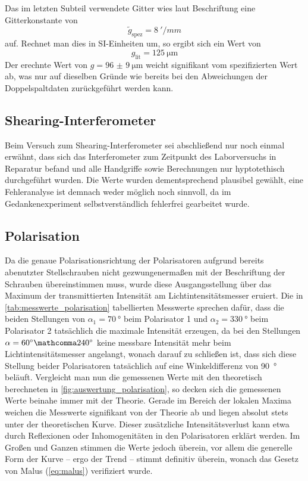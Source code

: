 \documentclass[ngerman]{scrartcl}
\begin{document}
Das im letzten Subteil verwendete Gitter wies laut Beschriftung eine Gitterkonstante von
\[\tilde{g}_{\text{spez}}=\SI{8}{'/mm}\]
auf. Rechnet man dies in SI-Einheiten um, so ergibt sich ein Wert von
\[g_{\text{lit}}=\SI{125}{\micro\meter}\]
Der erechnte Wert von \(g = \SI{96(9)}{\micro\meter}\) weicht signifikant vom spezifizierten Wert ab, was nur auf dieselben Gründe wie bereits bei den Abweichungen der Doppelspaltdaten zurückgeführt werden kann.


\subsection{Shearing-Interferometer}
\label{subsec:diskussion_shearing}

Beim Versuch zum Shearing-Interferometer sei abschließend nur noch einmal erwähnt, dass sich das Interferometer zum Zeitpunkt des Laborversuchs in Reparatur befand und alle Handgriffe sowie Berechnungen nur hyptotethisch durchgeführt wurden. Die Werte wurden dementsprechend plausibel gewählt, eine Fehleranalyse ist demnach weder möglich noch sinnvoll, da im Gedankenexperiment selbstverständlich fehlerfrei gearbeitet wurde.


\subsection{Polarisation}
\label{subsec:diskussion_polarisation}

Da die genaue Polarisationsrichtung der Polarisatoren aufgrund bereits abenutzter Stellschrauben nicht gezwungenermaßen mit der Beschriftung der Schrauben übereinstimmen muss, wurde diese Ausgangsstellung über das Maximum der transmittierten Intensität am Lichtintensitätsmesser eruiert. Die in \autoref{tab:messwerte_polarisation} tabellierten Messwerte sprechen dafür, dass die beiden Stellungen von $\alpha_1 = \SI{70}{\degree}$ beim Polarisator 1 und $\alpha_2 = \SI{330}{\degree}$ beim Polarisator 2 tatsächlich die maximale Intensität erzeugen, da bei den Stellungen $\alpha = \SI{60}{\degree} \mathcomma \SI{240}{\degree}$ keine messbare Intensität mehr beim Lichtintensitätsmesser angelangt, wonach darauf zu schließen ist, dass sich diese Stellung beider Polarisatoren tatsächlich auf eine Winkeldifferenz von \SI{90}{\degree} beläuft. Vergleicht man nun die gemessenen Werte mit den theoretisch berechneten in \autoref{fig:auswertung_polarisation}, so decken sich die gemessenen Werte beinahe immer mit der Theorie. Gerade im Bereich der lokalen Maxima weichen die Messwerte signifikant von der Theorie ab und liegen absolut stets unter der theoretischen Kurve. Dieser zusätzliche Intensitätsverlust kann etwa durch Reflexionen oder Inhomogenitäten in den Polarisatoren erklärt werden. Im Großen und Ganzen stimmen die Werte jedoch überein, vor allem die generelle Form der Kurve -- ergo der Trend -- stimmt definitiv überein, wonach das Gesetz von Malus (\autoref{eq:malus}) verifiziert wurde.
\end{document}
